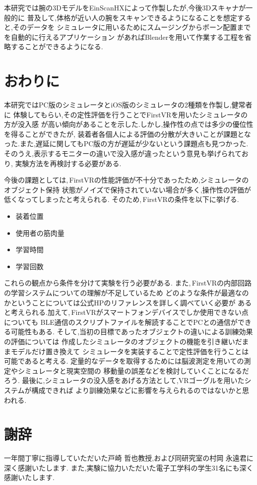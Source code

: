 \documentclass{ltjsreport}
\begin{document}
	本研究では腕の3DモデルをEinScanHXによって作製したが,今後3Dスキャナが一般的に
	普及して,体格が近い人の腕をスキャンできるようになることを想定すると,そのデータを
	シミュレータに用いるためにスムージングからボーン配置までを自動的に行えるアプリケーション
	があればBlenderを用いて作業する工程を省略することができるようになる.

\chapter{おわりに}
	本研究ではPC版のシミュレータとiOS版のシミュレータの2種類を作製し,健常者に
	体験してもらい,その定性評価を行うことでFirstVRを用いたシミュレータの方が没入感
	が高い傾向があることを示した.しかし,操作性の点では多少の優位性を得ることができたが,
	装着者各個人による評価の分散が大きいことが課題となった.また,遅延に関してもPC版の方が遅延が少ないという課題点も見つかった.
	そのうえ,表示するモニターの違いで没入感が違ったという意見も挙げられており,
	実験方法を再検討する必要がある.

	今後の課題としては,\,FirstVRの性能評価が不十分であったため,シミュレータのオブジェクト保持
	状態がノイズで保持されていない場合が多く,操作性の評価が低くなってしまったと考えられる.
	そのため,\,FirstVRの条件を以下に挙げる.
	\begin{itemize}
		\item 装着位置
		\item 使用者の筋肉量
		\item 学習時間
		\item 学習回数
	\end{itemize}
	これらの観点から条件を分けて実験を行う必要がある.
	また,\,FirstVRの内部回路の学習システムについての理解が不足しているため
	どのような条件が最適なのかということについては公式HPのリファレンスを詳しく調べていく必要が
	あると考えられる.加えて,\,FirstVRがスマートフォンデバイスでしか使用できない点についても
	BLE通信のスクリプトファイルを解読することでPCとの通信ができる可能性もある.
	そして,当初の目標であったオブジェクトの違いによる訓練効果の評価については
	作成したシミュレータのオブジェクトの機能を引き継いだままモデルだけ置き換えて
	シミュレータを実装することで定性評価を行うことは可能であると考える.
	定量的なデータを取得するためには脳波測定を用いての測定やシミュレータと現実空間の
	移動量の誤差などを検討していくことになるだろう.
	最後に,シミュレータの没入感をあげる方法として,VRゴーグルを用いたシステムが構成できれば
	より訓練効果などに影響を与えられるのではないかと思われる.
\clearpage

\chapter*{謝辞}
一年間丁寧に指導していただいた戸崎 哲也教授,および同研究室の村岡 永遠君に深く感謝いたします.
また,実験に協力いただいた電子工学科の学生31名にも深く感謝いたします.
\end{document}
